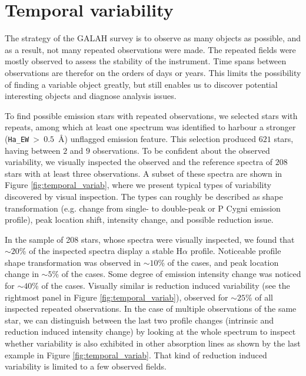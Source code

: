 \section{Temporal variability}
\label{sec:temporal}
The strategy of the GALAH survey is to observe as many objects as possible, and as a result, not many repeated observations were made. The repeated fields were mostly observed to assess the stability of the instrument. Time spans between observations are therefor on the orders of days or years. This limits the possibility of finding a variable object greatly, but still enables us to discover potential interesting objects and diagnose analysis issues.

To find possible emission stars with repeated observations, we selected stars with repeats, among which at least one spectrum was identified to harbour a stronger (\texttt{Ha\_EW}~>~$0.5$~\AA) unflagged emission feature. This selection produced $621$ stars, having between $2$ and $9$ observations. To be confident about the observed variability, we visually inspected the observed and the reference spectra of $208$ stars with at least three observations. A subset of these spectra are shown in Figure \ref{fig:temporal_variab}, where we present typical types of variability discovered by visual inspection. The types can roughly be described as shape transformation (e.g. change from single- to double-peak or P Cygni emission profile), peak location shift, intensity change, and possible reduction issue.

In the sample of 208 stars, whose spectra were visually inspected, we found that $\sim20$\% of the inspected spectra display a stable H$\alpha$ profile. Noticeable profile shape transformation was observed in $\sim10$\% of the cases, and peak location change in $\sim5$\% of the cases. Some degree of emission intensity change was noticed for $\sim40$\% of the cases. Visually similar is reduction induced variability (see the rightmost panel in Figure \ref{fig:temporal_variab}), observed for $\sim25$\% of all inspected repeated observations. In the case of multiple observations of the same star, we can distinguish between the last two profile changes (intrinsic and reduction induced intensity change) by looking at the whole spectrum to inspect whether variability is also exhibited in other absorption lines as shown by the last example in Figure \ref{fig:temporal_variab}. That kind of reduction induced variability is limited to a few observed fields. 

